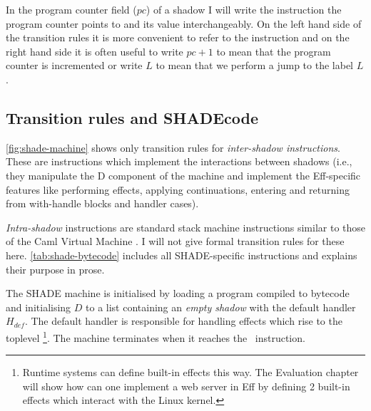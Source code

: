 \documentclass[class=article, crop=false]{standalone}
\begin{document}
In the program counter field ($pc$) of a shadow I will write the instruction
the program counter points to and its value interchangeably. On the left hand
side of the transition rules it is more convenient to refer to the instruction
and on the right hand side it is often useful to write $pc+1$ to mean that the
program counter is incremented or write $L$ to mean that we perform a jump to
the label $L$.

\subsection{Transition rules and SHADEcode}

\autoref{fig:shade-machine} shows only transition rules for \emph{inter-shadow
instructions}. These are instructions which implement the interactions between
shadows (i.e., they manipulate the D component of the machine and implement the
Eff-specific features like performing effects, applying continuations, entering
and returning from with-handle blocks and handler cases).

\emph{Intra-shadow} instructions are standard stack machine instructions similar
to those of the Caml Virtual Machine \cite{caml-vm}. I will not give formal
transition rules for these here. \autoref{tab:shade-bytecode} includes all
SHADE-specific instructions and explains their purpose in prose.

The SHADE machine is initialised by loading a program compiled to bytecode
and initialising $D$ to a list containing an \emph{empty shadow} with the
default handler $H_{def}$. The default handler is responsible for handling
effects which rise to the toplevel%
\footnote{Runtime systems can define built-in effects this way. The Evaluation
chapter will show how can one implement a web server in Eff by defining 2
built-in effects which interact with the Linux kernel.}.
The machine terminates when it reaches the \vmHalt\ instruction.
\end{document}
